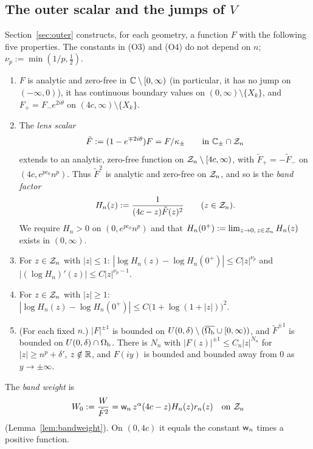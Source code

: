 \subsection{\texorpdfstring{The outer scalar and the jumps of $V$}{The outer scalar and the jumps of V}}\label{sec:frame-outer}
Section~\ref{sec:outer} constructs, for each geometry, a function $F$ with the following five properties. The
constants in (O3) and (O4) do not depend on $n$; $\nu_p:=\min(1/p,\frac12)$.
\begin{enumerate}
\item[(O1)] $F$ is analytic and zero-free in $\mathbb{C}\setminus[0,\infty)$ (in particular, it has no jump on $(-\infty,0)$),
  it has continuous boundary values on $(0,\infty)\setminus\{X_k\}$, and $F_+=F_-e^{2i\theta}$ on
  $(4c,\infty)\setminus\{X_k\}$.
\item[(O2)] The \emph{lens scalar}
  \begin{equation}\label{eq:Ftilde}
    \tilde F:=(1-e^{\mp2i\theta})F=F/\kappa_\pm\qquad\text{in }\mathbb{C}_\pm\cap\mathcal{Z}_n
  \end{equation}
  extends to an analytic, zero-free function on $\mathcal{Z}_n\setminus[4c,\infty)$, with $\tilde F_+=-\tilde F_-$ on
  $(4c,e^{pc_0}n^p)$. Thus $\tilde F^2$ is analytic and zero-free on $\mathcal{Z}_n$, and so is the \emph{band factor}
  \begin{equation}\label{eq:Hn}
    H_n(z):=\frac1{(4c-z)\tilde F(z)^2}\qquad(z\in\mathcal{Z}_n).
  \end{equation}
  We require $H_n>0$ on $(0,e^{pc_0}n^p)$ and that $H_n(0^+):=\lim_{z\to0,\,z\in\mathcal{Z}_n}H_n(z)$ exists in $(0,\infty)$.
\item[(O3)] For $z\in\mathcal{Z}_n$ with $|z|\le1$:
  $|\log H_n(z)-\log H_n(0^+)|\le C|z|^{\nu_p}$ and $|(\log H_n)'(z)|\le C|z|^{\nu_p-1}$.
\item[(O4)] For $z\in\mathcal{Z}_n$ with $|z|\ge1$: $|\log H_n(z)-\log H_n(0^+)|\le C\bigl(1+\log(1+|z|)\bigr)^2$.
\item[(O5)] (For each fixed $n$.) $|F|^{\pm1}$ is bounded on $U(0,\delta)\setminus(\overline{\Omega_{\mathrm{b}}}\cup[0,\infty))$, and
  $\tilde F^{\pm1}$ is bounded on $U(0,\delta)\cap\Omega_{\mathrm{b}}$. There is $N_n$ with $|F(z)|^{\pm1}\le C_n|z|^{N_n}$ for
  $|z|\ge n^p+\delta'$, $z\notin\mathbb{R}$, and $F(iy)$ is bounded and bounded away from $0$ as $y\to\pm\infty$.
\end{enumerate}
The \emph{band weight} is
\begin{equation}\label{eq:W0}
  W_0:=\frac W{\tilde F^2}=\mathsf w_n\,z^\alpha(4c-z)H_n(z)r_n(z)\quad\text{on }\mathcal{Z}_n
\end{equation}
(Lemma~\ref{lem:bandweight}). On $(0,4c)$ it equals the constant $\mathsf w_n$ times a positive function.

